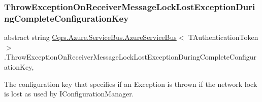 \subsubsection{\texorpdfstring{Throw\+Exception\+On\+Receiver\+Message\+Lock\+Lost\+Exception\+During\+Complete\+Configuration\+Key}{ThrowExceptionOnReceiverMessageLockLostExceptionDuringCompleteConfigurationKey}}
{\footnotesize\ttfamily abstract string \hyperlink{classCqrs_1_1Azure_1_1ServiceBus_1_1AzureServiceBus}{Cqrs.\+Azure.\+Service\+Bus.\+Azure\+Service\+Bus}$<$ T\+Authentication\+Token $>$.Throw\+Exception\+On\+Receiver\+Message\+Lock\+Lost\+Exception\+During\+Complete\+Configuration\+Key\hspace{0.3cm}{\ttfamily [get]}, {\ttfamily [protected]}}



The configuration key that specifies if an Exception is thrown if the network lock is lost as used by I\+Configuration\+Manager. 

